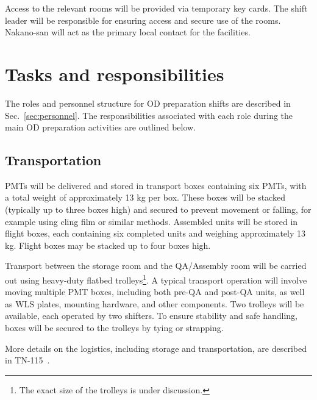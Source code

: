 \documentclass[12pt,a4paper]{article}
\begin{document}
Access to the relevant rooms will be provided via temporary key cards. The shift leader will be responsible for ensuring access and secure use of the rooms. Nakano-san will act as the primary local contact for the facilities.


\section{Tasks and responsibilities}
The roles and personnel structure for OD preparation shifts are described in Sec.~\ref{sec:personnel}. The responsibilities associated with each role during the main OD preparation activities are outlined below.

\subsection{Transportation}
PMTs will be delivered and stored in transport boxes containing six PMTs, with a total weight of approximately 13 kg per box. These boxes will be stacked (typically up to three boxes high) and secured to prevent movement or falling, for example using cling film or similar methods. Assembled units will be stored in flight boxes, each containing six completed units and weighing approximately 13 kg. Flight boxes may be stacked up to four boxes high.


Transport between the storage room and the QA/Assembly room will be carried out using heavy-duty flatbed trolleys\footnote{The exact size of the trolleys is under discussion.}. A typical transport operation will involve moving multiple PMT boxes, including both pre-QA and post-QA units, as well as WLS plates, mounting hardware, and other components. Two trolleys will be available, each operated by two shifters. To ensure stability and safe handling, boxes will be secured to the trolleys by tying or strapping.

More details on the logistics, including storage and transportation, are described in TN-115~\cite{ODAssemblyTN}.
\end{document}
